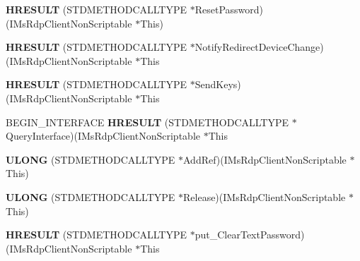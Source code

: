 \begin{DoxyCompactItemize}
\item 
\mbox{\label{struct_i_ms_rdp_client_non_scriptable_vtbl_a97a8f2eea25bd62c20dbcb57674b9199}} 
{\bfseries H\+R\+E\+S\+U\+LT} (S\+T\+D\+M\+E\+T\+H\+O\+D\+C\+A\+L\+L\+T\+Y\+PE $\ast$Reset\+Password)(I\+Ms\+Rdp\+Client\+Non\+Scriptable $\ast$This)
\item 
\mbox{\label{struct_i_ms_rdp_client_non_scriptable_vtbl_a34cfa8fe9b70d25ff2ff4bc141b8196d}} 
{\bfseries H\+R\+E\+S\+U\+LT} (S\+T\+D\+M\+E\+T\+H\+O\+D\+C\+A\+L\+L\+T\+Y\+PE $\ast$Notify\+Redirect\+Device\+Change)(I\+Ms\+Rdp\+Client\+Non\+Scriptable $\ast$This
\item 
\mbox{\label{struct_i_ms_rdp_client_non_scriptable_vtbl_a0c99c48cec27d6c1b0b8924c208a7164}} 
{\bfseries H\+R\+E\+S\+U\+LT} (S\+T\+D\+M\+E\+T\+H\+O\+D\+C\+A\+L\+L\+T\+Y\+PE $\ast$Send\+Keys)(I\+Ms\+Rdp\+Client\+Non\+Scriptable $\ast$This
\item 
\mbox{\label{struct_i_ms_rdp_client_non_scriptable_vtbl_a06c0380c15367d12fe5e0be71d622de9}} 
B\+E\+G\+I\+N\+\_\+\+I\+N\+T\+E\+R\+F\+A\+CE {\bfseries H\+R\+E\+S\+U\+LT} (S\+T\+D\+M\+E\+T\+H\+O\+D\+C\+A\+L\+L\+T\+Y\+PE $\ast$Query\+Interface)(I\+Ms\+Rdp\+Client\+Non\+Scriptable $\ast$This
\item 
\mbox{\label{struct_i_ms_rdp_client_non_scriptable_vtbl_a0c8fce12e0cf0c6b86d3fb3410a88b90}} 
{\bfseries U\+L\+O\+NG} (S\+T\+D\+M\+E\+T\+H\+O\+D\+C\+A\+L\+L\+T\+Y\+PE $\ast$Add\+Ref)(I\+Ms\+Rdp\+Client\+Non\+Scriptable $\ast$This)
\item 
\mbox{\label{struct_i_ms_rdp_client_non_scriptable_vtbl_a2503ea20f3ddc586255f723dc64e3189}} 
{\bfseries U\+L\+O\+NG} (S\+T\+D\+M\+E\+T\+H\+O\+D\+C\+A\+L\+L\+T\+Y\+PE $\ast$Release)(I\+Ms\+Rdp\+Client\+Non\+Scriptable $\ast$This)
\item 
\mbox{\label{struct_i_ms_rdp_client_non_scriptable_vtbl_a47a2f7caf3d1c7f5d4ba1d4ba162d161}} 
{\bfseries H\+R\+E\+S\+U\+LT} (S\+T\+D\+M\+E\+T\+H\+O\+D\+C\+A\+L\+L\+T\+Y\+PE $\ast$put\+\_\+\+Clear\+Text\+Password)(I\+Ms\+Rdp\+Client\+Non\+Scriptable $\ast$This

\end{DoxyCompactItemize}

